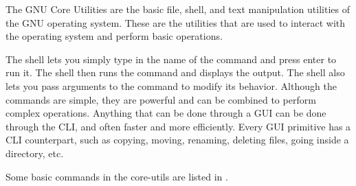 \begin{definition}
  The GNU Core Utilities are the basic file, shell, and text manipulation utilities of the GNU operating system. These are the utilities that are used to interact with the operating system and perform basic operations.
\end{definition}

The shell lets you simply type in the name of the command and press enter to run it.
The shell then runs the command and displays the output.
The shell also lets you pass arguments to the command to modify its behavior.
Although the commands are simple, they are powerful and can be combined to perform complex operations.
Anything that can be done through a GUI can be done through the CLI, and often faster and more efficiently.
Every GUI primitive has a CLI counterpart, such as copying, moving, renaming, deleting files, going inside a directory, etc.

Some basic commands in the core-utils are listed in .


